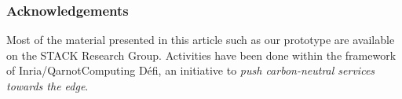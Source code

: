 
\subsubsection{Acknowledgements}
Most of the material presented in this article such as our prototype
are available on the STACK Research Group. Activities have been done
within the framework of Inria/QarnotComputing Défi, an initiative to
\emph{push carbon-neutral services towards the edge}.

